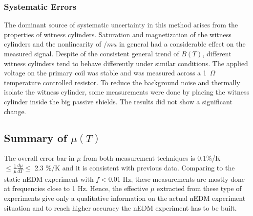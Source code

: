 \documentclass[review]{elsarticle}
\begin{document}
\subsubsection{Systematic Errors}

%


The dominant source of systematic uncertainty in this method arises
from the properties of witness cylinders. Saturation and magnetization
of the witness cylinders and the nonlinearity of $/mu$ in general had
a considerable effect on the measured signal. Despite of the
consistent general trend of $B(T)$, different witness cylinders tend
to behave differently under similar conditions. The applied voltage on
the primary coil was stable and was measured across a 1~$\Omega$
temperature controlled resistor. To reduce the background noise and
thermally isolate the witness cylinder, some measurements were done by
placing the witness cylinder inside the big passive shields. The
results did not show a significant change.


\subsection{Summary of $\mu(T)$}
The overall error bar in $\mu$ from both measurement techniques is 0.1\%/K $\leq \frac{1}{\mu}\frac{d\mu}{dT} \leq$ 2.3 \%/K and it is consistent with previous data.
Comparing to the static nEDM experiment with $f < 0.01$ Hz, these measurements are mostly done at frequencies close to 1 Hz. Hence, the effective $\mu$ extracted from these type of experiments give
only a qualitative information on the actual nEDM experiment situation and to reach higher accuracy the nEDM experiment has to be built. 
\end{document}
